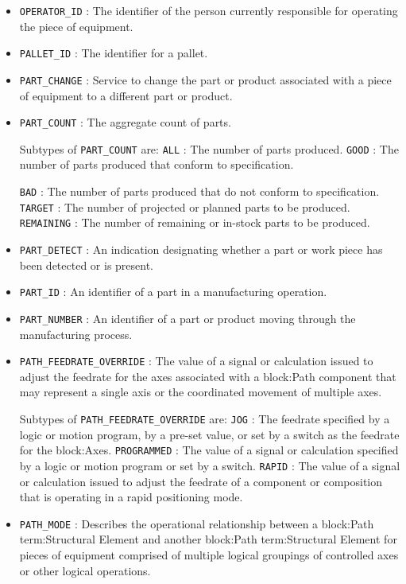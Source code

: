 \begin{itemize}
\item \texttt{OPERATOR_ID} : The identifier of the person currently responsible for operating the piece of equipment. 

\item \texttt{PALLET_ID} : The identifier for a pallet. 

\item \texttt{PART_CHANGE} : Service to change the part or product associated with a piece of equipment to a different part or product. 

\item \texttt{PART_COUNT} : The aggregate count of parts. 

Subtypes of \texttt{PART_COUNT} are: 
\newline\tab \texttt{ALL} : The number of parts produced.  
\newline\tab \texttt{GOOD} : The number of parts produced that conform to specification.
 
\newline\tab \texttt{BAD} : The number of parts produced that do not conform to specification. 
\newline\tab \texttt{TARGET} : The number of projected or planned parts to be produced. 
\newline\tab \texttt{REMAINING} : The number of remaining or in-stock parts to be produced. 
\item \texttt{PART_DETECT} : An indication designating whether a part or work piece has been detected or is present. 

\item \texttt{PART_ID} : An identifier of a part in a manufacturing operation. 

\item \texttt{PART_NUMBER} : An identifier of a part or product moving through the manufacturing process. 

\item \texttt{PATH_FEEDRATE_OVERRIDE} : The value of a signal or calculation issued to adjust the feedrate for the axes associated with a {block:Path} component that may represent a single axis or the coordinated movement of multiple axes. 

Subtypes of \texttt{PATH_FEEDRATE_OVERRIDE} are: 
\newline\tab \texttt{JOG} : The feedrate specified by a logic or motion program, by a pre-set value, or set by a switch as the feedrate for the {block:Axes}.  
\newline\tab \texttt{PROGRAMMED} : The value of a signal or calculation specified by a logic or motion program or set by a switch. 
\newline\tab \texttt{RAPID} : The value of a signal or calculation issued to adjust the feedrate of a component or composition that is operating in a rapid positioning mode. 
\item \texttt{PATH_MODE} : Describes the operational relationship between a {block:Path} {term:Structural Element} and another {block:Path} {term:Structural Element} for pieces of equipment comprised of multiple logical groupings of controlled axes or other logical operations. 


\end{itemize}
